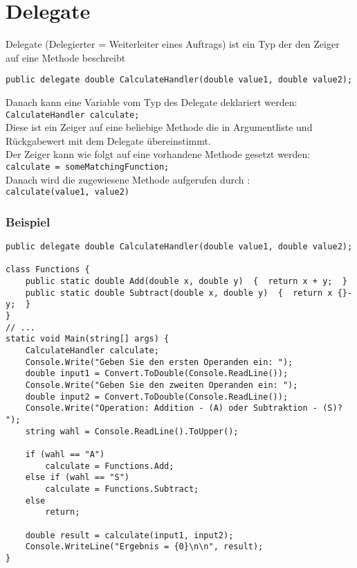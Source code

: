 \section{Delegate}
Delegate (Delegierter = Weiterleiter eines Auftrags) ist ein Typ der den Zeiger auf eine Methode beschreibt
\begin{lstlisting}[language={[Sharp]C}]
	public delegate double CalculateHandler(double value1, double value2); 
\end{lstlisting}
Danach kann eine Variable vom Typ des Delegate deklariert werden:\\
\lstinline$CalculateHandler calculate;$\\
Diese ist ein Zeiger auf eine beliebige Methode die in Argumentliste und Rückgabewert mit dem Delegate übereinstimmt.\\
Der Zeiger kann wie folgt auf eine vorhandene Methode gesetzt werden:\\
\lstinline$calculate = someMatchingFunction;$\\
Danach wird die zugewiesene Methode aufgerufen durch :\\
\lstinline$calculate(value1, value2)$

\subsubsection*{Beispiel}

\begin{lstlisting}[language={[Sharp]C}]
public delegate double CalculateHandler(double value1, double value2);

class Functions {
	public static double Add(double x, double y)  {  return x + y;  }
	public static double Subtract(double x, double y)  {  return x {}- y;  }
}
// ...
static void Main(string[] args) {
	CalculateHandler calculate;
	Console.Write("Geben Sie den ersten Operanden ein: ");
	double input1 = Convert.ToDouble(Console.ReadLine());
	Console.Write("Geben Sie den zweiten Operanden ein: ");
	double input2 = Convert.ToDouble(Console.ReadLine());  
	Console.Write("Operation: Addition - (A) oder Subtraktion - (S)? ");
	string wahl = Console.ReadLine().ToUpper();

	if (wahl == "A")
		calculate = Functions.Add;
	else if (wahl == "S") 
		calculate = Functions.Subtract;
	else 
		return;

	double result = calculate(input1, input2);
	Console.WriteLine("Ergebnis = {0}\n\n", result);
}
\end{lstlisting}

